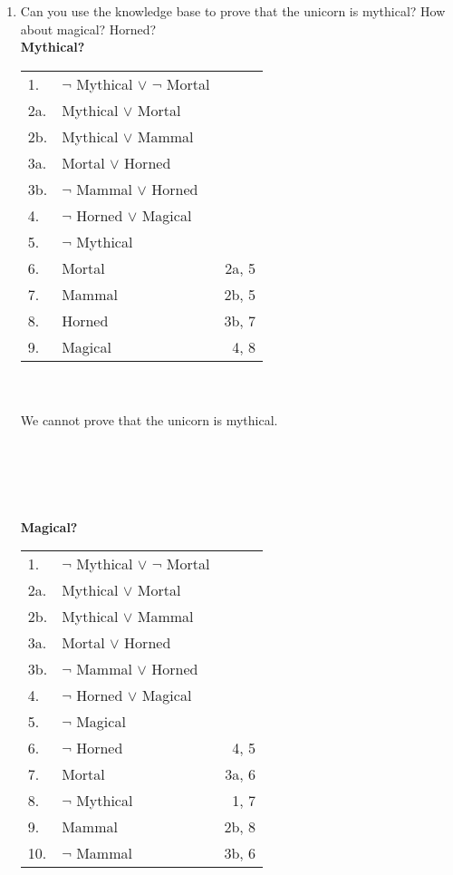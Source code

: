 \documentclass[12pt]{article}
\begin{document}
\begin{enumerate}
\begin{enumerate}
		\item Can you use the knowledge base to prove that the unicorn is mythical? How about magical? Horned?\\

		\textbf{Mythical?}\\

		\begin{tabular}{l l r}
			1. & $\neg$ Mythical $\lor$ $\neg$ Mortal & \\
			2a. & Mythical $\lor$ Mortal & \\
			2b. & Mythical $\lor$ Mammal & \\
			3a. & Mortal $\lor$ Horned & \\
			3b. & $\neg$ Mammal $\lor$ Horned & \\
			4. & $\neg$ Horned $\lor$ Magical & \\
			5. & $\neg$ Mythical & \\
			\hline
			6. & Mortal & 2a, 5 \\
			7. & Mammal & 2b, 5 \\
			8. & Horned & 3b, 7 \\
			9. & Magical & 4, 8 \\
		\end{tabular}\\\\

		We cannot prove that the unicorn is mythical. \\\\\\\\\\\\

		\textbf{Magical?}\\

		\begin{tabular}{l l r}
			1. & $\neg$ Mythical $\lor$ $\neg$ Mortal & \\
			2a. & Mythical $\lor$ Mortal & \\
			2b. & Mythical $\lor$ Mammal & \\
			3a. & Mortal $\lor$ Horned & \\
			3b. & $\neg$ Mammal $\lor$ Horned & \\
			4. & $\neg$ Horned $\lor$ Magical & \\
			5. & $\neg$ Magical & \\
			\hline
			6. & $\neg$ Horned & 4, 5 \\
			7. & Mortal & 3a, 6 \\
			8. & $\neg$ Mythical & 1, 7 \\
			9. & Mammal & 2b, 8 \\
			10. & $\neg$ Mammal & 3b, 6 \\
		\end{tabular}\\\\


\end{enumerate}
\end{enumerate}
\end{document}
